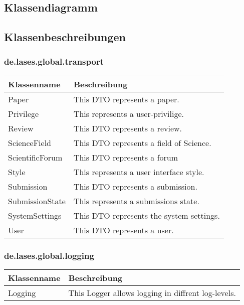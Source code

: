 
\newcommand{\classtable}[1]{\begin{longtable}[H]{|m{5cm}|m{9cm}|}
		\hline
		\textbf{Klassenname} & \textbf{Beschreibung} \\
		\hline
		\hline
		#1
	\end{longtable}
}

\newcommand{\classentry}[2]{#1 & #2 \\
	\hline}


\subsection{Klassendiagramm}


\subsection{Klassenbeschreibungen}

\subsubsection{de.lases.global.transport}

\classtable{
	\classentry{Paper}{This DTO represents a paper.}
	\classentry{Privilege}{This represents a user-privilige.}
	\classentry{Review}{This DTO represents a review.}
	\classentry{ScienceField}{This DTO represents a field of Science.}
	\classentry{ScientificForum}{This DTO represents a forum}
	\classentry{Style}{This represents a user interface style.}
	\classentry{Submission}{This DTO represents a submission.}
	\classentry{SubmissionState}{This represents a submissions state.}
	\classentry{SystemSettings}{This DTO represents the system settings.}
	\classentry{User}{This DTO represents a user.}
}

\subsubsection{de.lases.global.logging}

\classtable{
	\classentry{Logging}{This Logger allows logging in diffrent log-levels.}
}